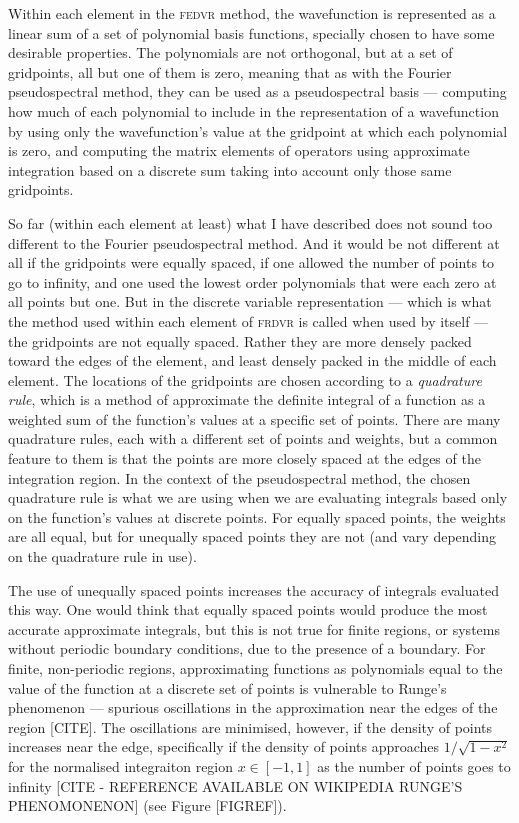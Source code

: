 Within each element in the \textsc{fedvr} method, the wavefunction is represented as a linear sum of a set of polynomial basis functions, specially chosen to have some desirable properties. The polynomials are not orthogonal, but at a set of gridpoints, all but one of them is zero, meaning that as with the Fourier pseudospectral method, they can be used as a pseudospectral basis --- computing how much of each polynomial to include in the representation of a wavefunction by using only the wavefunction's value at the gridpoint at which each polynomial is zero, and computing the matrix elements of operators using approximate integration based on a discrete sum taking into account only those same gridpoints.

So far (within each element at least) what I have described does not sound too different to the Fourier pseudospectral method. And it would be not different at all if the gridpoints were equally spaced, if one allowed the number of points to go to infinity, and one used the lowest order polynomials that were each zero at all points but one. But in the discrete variable representation --- which is what the method used within each element of \textsc{frdvr} is called when used by itself --- the gridpoints are not equally spaced. Rather they are more densely packed toward the edges of the element, and least densely packed in the middle of each element. The locations of the gridpoints are chosen according to a \emph{quadrature rule}, which is a method of approximate the definite integral of a function as a  weighted sum of the function's values at a specific set of points. There are many quadrature rules, each with a different set of points and weights, but a common feature to them is that the points are more closely spaced at the edges of the integration region. In the context of the pseudospectral method, the chosen quadrature rule is what we are using when we are evaluating integrals based only on the function's values at discrete points. For equally spaced points, the weights are all equal, but for unequally spaced points they are not (and vary depending on the quadrature rule in use).

The use of unequally spaced points increases the accuracy of integrals evaluated this way. One would think that equally spaced points would produce the most accurate approximate integrals, but this is not true for finite regions, or systems without periodic boundary conditions, due to the presence of a boundary. For finite, non-periodic regions, approximating functions as polynomials equal to the value of the function at a discrete set of points is vulnerable to Runge's phenomenon --- spurious oscillations in the approximation near the edges of the region [CITE]. The oscillations are minimised, however, if the density of points increases near the edge, specifically if the density of points approaches $1/\sqrt{1 - x^2}$ for the normalised integraiton region $x \in [-1, 1]$ as the number of points goes to infinity [CITE - REFERENCE AVAILABLE ON WIKIPEDIA RUNGE'S PHENOMONENON] (see Figure [FIGREF]). 

